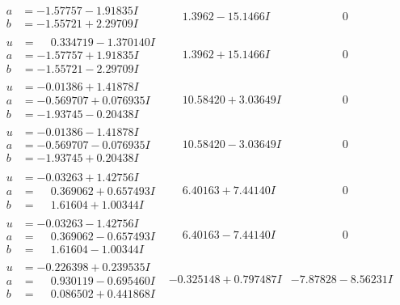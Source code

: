 \documentclass[1p]{elsarticle_modified}
\theoremstyle{definition}
\begin{document}
$$\begin{array}{c|c|c}
\begin{aligned}
a &= -1.57757 - 1.91835 I \\
b &= -1.55721 + 2.29709 I\end{aligned}
 & \phantom{-}1.3962 - 15.1466 I & \phantom{-0.000000 } 0 \\ \hline\begin{aligned}
u &= \phantom{-}0.334719 - 1.370140 I \\
a &= -1.57757 + 1.91835 I \\
b &= -1.55721 - 2.29709 I\end{aligned}
 & \phantom{-}1.3962 + 15.1466 I & \phantom{-0.000000 } 0 \\ \hline\begin{aligned}
u &= -0.01386 + 1.41878 I \\
a &= -0.569707 + 0.076935 I \\
b &= -1.93745 - 0.20438 I\end{aligned}
 & \phantom{-}10.58420 + 3.03649 I & \phantom{-0.000000 } 0 \\ \hline\begin{aligned}
u &= -0.01386 - 1.41878 I \\
a &= -0.569707 - 0.076935 I \\
b &= -1.93745 + 0.20438 I\end{aligned}
 & \phantom{-}10.58420 - 3.03649 I & \phantom{-0.000000 } 0 \\ \hline\begin{aligned}
u &= -0.03263 + 1.42756 I \\
a &= \phantom{-}0.369062 + 0.657493 I \\
b &= \phantom{-}1.61604 + 1.00344 I\end{aligned}
 & \phantom{-}6.40163 + 7.44140 I & \phantom{-0.000000 } 0 \\ \hline\begin{aligned}
u &= -0.03263 - 1.42756 I \\
a &= \phantom{-}0.369062 - 0.657493 I \\
b &= \phantom{-}1.61604 - 1.00344 I\end{aligned}
 & \phantom{-}6.40163 - 7.44140 I & \phantom{-0.000000 } 0 \\ \hline\begin{aligned}
u &= -0.226398 + 0.239535 I \\
a &= \phantom{-}0.930119 - 0.695460 I \\
b &= \phantom{-}0.086502 + 0.441868 I\end{aligned}
 & -0.325148 + 0.797487 I & -7.87828 - 8.56231 I \\ \hline\begin{aligned}

\end{aligned}
\end{array}$$
\end{document}

